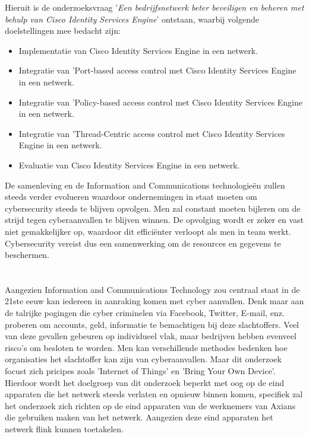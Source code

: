 \newline
\newline
Hieruit is de onderzoeksvraag '\textit{Een bedrijfsnetwerk beter beveiligen en beheren met behulp van Cisco Identity Services Engine}' ontstaan, waarbij volgende doelstellingen mee bedacht zijn: 

\begin{itemize}
	\item Implementatie van Cisco Identity Services Engine in een netwerk.
	\item Integratie van 'Port-based access control met Cisco Identity Services Engine in een netwerk.
	\item Integratie van 'Policy-based access control met Cisco Identity Services Engine in een netwerk.
	\item Integratie van 'Thread-Centric access control met Cisco Identity Services Engine in een netwerk.
	\item Evaluatie van Cisco Identity Services Engine in een netwerk.
\end{itemize}

De samenleving en de Information and Communications technologieën zullen steeds verder evolueren waardoor ondernemingen in staat moeten om cybersecurity steeds te blijven opvolgen. Men zal constant moeten bijleren om de strijd tegen cyberaanvallen te blijven winnen. De opvolging wordt er zeker en vast niet gemakkelijker op, waardoor dit efficiënter verloopt als men in team werkt. Cybersecurity vereist dus een samenwerking om de resources en gegevens te beschermen.

\section{}
\label{sec:probleemstelling}
Aangezien Information and Communications Technology zou centraal staat in de 21ste eeuw kan iedereen in aanraking komen met cyber aanvallen. Denk maar aan de talrijke pogingen die cyber criminelen via Facebook, Twitter, E-mail, enz. proberen om accounts, geld, informatie te bemachtigen bij deze slachtoffers. Veel van deze gevallen gebeuren op individueel vlak, maar bedrijven hebben evenveel risco's om besloten te worden. Men kan verschillende methodes bedenken hoe organisaties het slachtoffer kan zijn van cyberaanvallen. Maar dit onderzoek focust zich pricipes zoals 'Internet of Things' en 'Bring Your Own Device'.
\newline
\newline
Hierdoor wordt het doelgroep van dit onderzoek beperkt met oog op de eind apparaten die het netwerk steeds verlaten en opnieuw binnen komen, specifiek zal het onderzoek zich richten op de eind apparaten van de werknemers van Axians die gebruiken maken van het netwerk. Aangezien deze eind apparaten het netwerk flink kunnen toetakelen.



